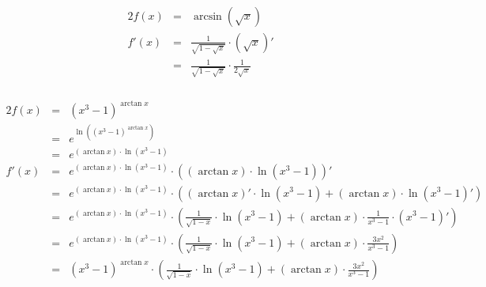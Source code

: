 \documentclass[10pt,a4paper,oneside,ngerman,numbers=noenddot]{scrartcl}
\begin{document}
\subsubsection{} %
\begin{alignat*}{2}
f(x) &=& \arcsin (\sqrt{x}) \\
f'(x) &=& \frac{1}{\sqrt{1 - \sqrt{x}}} \cdot (\sqrt{x})' \\
&=& \frac{1}{\sqrt{1 - \sqrt{x}}} \cdot \frac{1}{2 \sqrt{x}}
\end{alignat*}
\subsubsection{} %
\begin{alignat*}{2}
f(x) &=& (x^{3}-1)^{\arctan x} \\
&=& e^{\ln \left((x^{3}-1)^{\arctan x} \right)} \\
&=& e^{\left(\arctan x \right) \cdot \ln \left(x^{3}-1 \right)} \\
f'(x) &=& e^{\left(\arctan x \right) \cdot \ln \left(x^{3}-1 \right)} \cdot \left( \left(\arctan x \right) \cdot \ln \left(x^{3}-1 \right)\right)' \\
&=& e^{\left(\arctan x \right) \cdot \ln \left(x^{3}-1 \right)} \cdot \left( \left(\arctan x \right)' \cdot \ln \left(x^{3}-1 \right) + \left(\arctan x \right) \cdot \ln \left(x^{3}-1 \right)' \right) \\
&=& e^{\left(\arctan x \right) \cdot \ln \left(x^{3}-1 \right)} \cdot \left( \frac{1}{\sqrt{1 - x}} \cdot \ln \left(x^{3}-1 \right) + \left(\arctan x \right) \cdot \frac{1}{x^{3}-1} \cdot (x^{3}-1)' \right) \\
&=& e^{\left(\arctan x \right) \cdot \ln \left(x^{3}-1 \right)} \cdot \left( \frac{1}{\sqrt{1 - x}} \cdot \ln \left(x^{3}-1 \right) + \left(\arctan x \right) \cdot \frac{3x^{2}}{x^{3}-1}\right) \\
&=& (x^{3}-1)^{\arctan x} \cdot \left( \frac{1}{\sqrt{1 - x}} \cdot \ln \left(x^{3}-1 \right) + \left(\arctan x \right) \cdot \frac{3x^{2}}{x^{3}-1}\right)
\end{alignat*}
\end{document}
